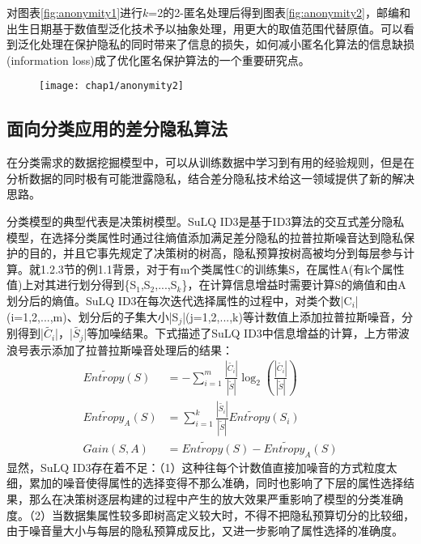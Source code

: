 对图表\ref{fig:anonymity1}进行$k$=2的2-匿名处理后得到图表\ref{fig:anonymity2}，邮编和出生日期基于数值型泛化技术予以抽象处理，用更大的取值范围代替原值。可以看到泛化处理在保护隐私的同时带来了信息的损失，如何减小匿名化算法的信息缺损(information loss)\cite{Bottom-up generalization}\cite{Top-down specialization}成了优化匿名保护算法的一个重要研究点。

\begin{figure}[!htp]
	\centering
	\texttt{[image: chap1/anonymity2]}
\end{figure}

\subsection{面向分类应用的差分隐私算法}  %

在分类需求的数据挖掘模型中，可以从训练数据中学习到有用的经验规则，但是在分析数据的同时极有可能泄露隐私，结合差分隐私技术给这一领域提供了新的解决思路。

分类模型的典型代表是决策树模型。SuLQ ID3\cite{SuLQ}是基于ID3算法的交互式差分隐私模型，在选择分类属性时通过往熵值添加满足差分隐私的拉普拉斯噪音达到隐私保护的目的，并且它事先规定了决策树的树高，隐私预算按树高被均分到每层参与计算。就1.2.3节的例1.1背景，对于有m个类属性C的训练集S，在属性A(有k个属性值)上对其进行划分得到\{S$_{1}$,S$_{2}$,...,S$_{k}$\}，在计算信息增益时需要计算S的熵值和由A划分后的熵值。SuLQ ID3在每次迭代选择属性的过程中，对类个数|C$_{i}$|(i=1,2,...,m)、划分后的子集大小|S$_{j}$|(j=1,2,...,k)等计数值上添加拉普拉斯噪音，分别得到|$\widetilde{C_{i}}$|，|$\widetilde{S_{j}}$|等加噪结果。下式描述了SuLQ ID3中信息增益的计算，上方带波浪号表示添加了拉普拉斯噪音处理后的结果：
\[
\begin{split}
	En\widetilde{tro}py(S) &= -\sum_{i=1}^{m}\frac{|\widetilde{C_{i}}|}{|\widetilde{S}|}\log_{2}(\frac{|\widetilde{C_{i}}|}{|\widetilde{S}|})\\
	En\widetilde{tro}py_{A}(S) &= \sum_{i=1}^{k}\frac{|\widetilde{S_{i}}|}{|\widetilde{S}|}En\widetilde{tro}py(S_{i})\\
	Gain(S,A) &= En\widetilde{tro}py(S)-En\widetilde{tro}py_{A}(S)
\end{split}	
\]
显然，SuLQ ID3存在着不足：（1）这种往每个计数值直接加噪音的方式粒度太细，累加的噪音使得属性的选择变得不那么准确，同时也影响了下层的属性选择结果，那么在决策树逐层构建的过程中产生的放大效果严重影响了模型的分类准确度。（2）当数据集属性较多即树高定义较大时，不得不把隐私预算切分的比较细，由于噪音量大小与每层的隐私预算成反比，又进一步影响了属性选择的准确度。

